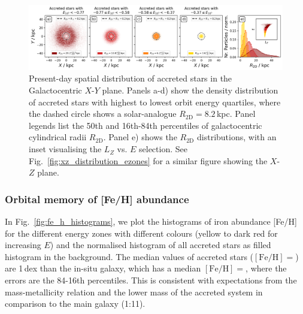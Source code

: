 \documentclass[fleqn,usenatbib]{mnras}
\begin{document}
\begin{figure}
    \centering
    \includegraphics[width=\textwidth]{figures/xy_distribution_ezones.png}
    \caption{Present-day spatial distribution of accreted stars in the Galactocentric $X$-$Y$ plane. Panels a-d) show the density distribution of accreted stars with highest to lowest orbit energy quartiles, where the dashed circle shows a solar-analogue $R_\mathrm{2D}=8.2$\,kpc. Panel legends list the 50th and 16th-84th percentiles of galactocentric cylindrical radii $R_\mathrm{2D}$. Panel e) shows the $R_\mathrm{2D}$ distributions, with an inset visualising the $L_Z$ vs. $E$ selection. See Fig.~\ref{fig:xz_distribution_ezones} for a similar figure showing the $X$-$Z$ plane.}
    \label{fig:xy_distribution_ezones}
\end{figure}

\subsubsection{Orbital memory of {[Fe/H]} abundance}

In Fig.~\ref{fig:fe_h_histograms}, we plot the histograms of iron abundance [Fe/H] for the different energy zones with different colours (yellow to dark red for increasing $E$) and the normalised histogram of all accreted stars as filled histogram in the background. The median values of accreted stars ($\mathrm{[Fe/H]} = $) are 1\,dex than the in-situ galaxy, which has a median $\mathrm{[Fe/H]} = $, where the errors are the 84-16th percentiles. This is consistent with expectations from the mass-metallicity relation \citep[for example][]{Gallazzi2005, Kirby2013} and the lower mass of the accreted system in comparison to the main galaxy (1:11).
\end{document}
